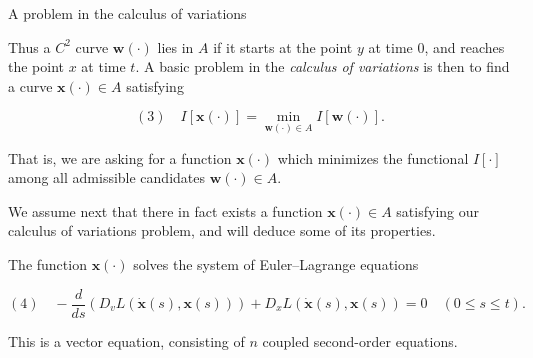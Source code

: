 A problem in the calculus of variations

Thus a $C^2$ curve $\mathbf{w}(\cdot)$ lies in $A$ if it starts at the point $y$ at time $0$, and reaches the point $x$ at time $t$. A basic problem in the \textit{calculus of variations} is then to find a curve $\mathbf{x}(\cdot) \in A$ satisfying

$$(3) \quad I[\mathbf{x}(\cdot)] = \min_{\mathbf{w}(\cdot) \in A} I[\mathbf{w}(\cdot)].$$

That is, we are asking for a function $\mathbf{x}(\cdot)$ which minimizes the functional $I[\cdot]$ among all admissible candidates $\mathbf{w}(\cdot) \in A$.

We assume next that there in fact exists a function $\mathbf{x}(\cdot) \in A$ satisfying our calculus of variations problem, and will deduce some of its properties.

\begin{theorem}
\label{thm:euler-lagrange-equations}
The function $\mathbf{x}(\cdot)$ solves the system of Euler--Lagrange equations

$$(4) \quad -\frac{d}{ds}(D_v L(\dot{\mathbf{x}}(s), \mathbf{x}(s))) + D_x L(\dot{\mathbf{x}}(s), \mathbf{x}(s)) = 0 \quad (0 \leq s \leq t).$$

This is a vector equation, consisting of $n$ coupled second-order equations.
\end{theorem}

